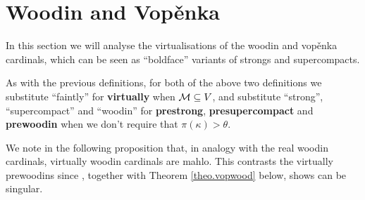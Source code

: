 \documentclass[../main]{subfiles}
\begin{document}
\pagebreak
\section{Woodin and Vop\v enka}
\label{sect.woodvop}

In this section we will analyse the virtualisations of the woodin and vop\v enka cardinals, which can be seen as ``boldface'' variants of strongs and supercompacts.



As with the previous definitions, for both of the above two definitions we substitute ``faintly'' for \textbf{virtually} when $\operatorname{\mathcal M}\subseteq V$, and substitute ``strong'', ``supercompact'' and ``woodin'' for \textbf{prestrong}, \textbf{presupercompact} and \textbf{prewoodin} when we don't require that $\pi(\kappa)>\theta$.

\qquad We note in the following proposition that, in analogy with the real woodin cardinals, virtually woodin cardinals are mahlo. This contrasts the virtually prewoodins since \cite{Wilson}, together with Theorem \ref{theo.vopwood} below, shows can be singular.
\end{document}

